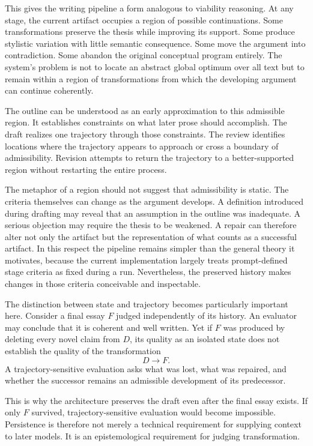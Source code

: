 \documentclass[11pt]{article}
\begin{document}
This gives the writing pipeline a form analogous to viability reasoning. At any stage, the current artifact occupies a region of possible continuations. Some transformations preserve the thesis while improving its support. Some produce stylistic variation with little semantic consequence. Some move the argument into contradiction. Some abandon the original conceptual program entirely. The system's problem is not to locate an abstract global optimum over all text but to remain within a region of transformations from which the developing argument can continue coherently.

The outline can be understood as an early approximation to this admissible region. It establishes constraints on what later prose should accomplish. The draft realizes one trajectory through those constraints. The review identifies locations where the trajectory appears to approach or cross a boundary of admissibility. Revision attempts to return the trajectory to a better-supported region without restarting the entire process.

The metaphor of a region should not suggest that admissibility is static. The criteria themselves can change as the argument develops. A definition introduced during drafting may reveal that an assumption in the outline was inadequate. A serious objection may require the thesis to be weakened. A repair can therefore alter not only the artifact but the representation of what counts as a successful artifact. In this respect the pipeline remains simpler than the general theory it motivates, because the current implementation largely treats prompt-defined stage criteria as fixed during a run. Nevertheless, the preserved history makes changes in those criteria conceivable and inspectable.

The distinction between state and trajectory becomes particularly important here. Consider a final essay \(F\) judged independently of its history. An evaluator may conclude that it is coherent and well written. Yet if \(F\) was produced by deleting every novel claim from \(D\), its quality as an isolated state does not establish the quality of the transformation
\[
    D\rightarrow F.
\]
A trajectory-sensitive evaluation asks what was lost, what was repaired, and whether the successor remains an admissible development of its predecessor.

This is why the architecture preserves the draft even after the final essay exists. If only \(F\) survived, trajectory-sensitive evaluation would become impossible. Persistence is therefore not merely a technical requirement for supplying context to later models. It is an epistemological requirement for judging transformation.
\end{document}
